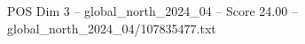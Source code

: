 \begin{textsample}{POS Dim 3 – global\_north\_2024\_04 – Score 24.00 – global\_north\_2024\_04/107835477.txt}
\end{textsample}
